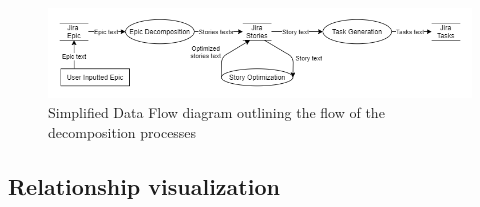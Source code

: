 \begin{figure}
\centerline{\includegraphics[width=\textwidth,height=\textheight,keepaspectratio]{./figure/ExampleDataFlowDiagram.png}}
\caption{Simplified Data Flow diagram outlining the flow of the decomposition processes}
\end{figure}


\subsection{Relationship visualization}